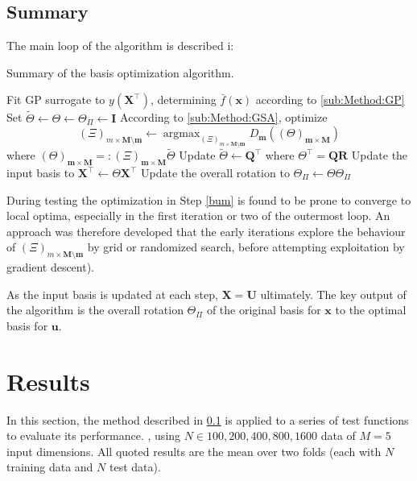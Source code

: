 \documentclass[preprint,12pt]{elsarticle}
\newcommand*{\M}[1]{\ensuremath{#1}\xspace}
\newcommand*{\vr}[1]{\M{\mathbf{#1}}}
\newcommand*{\deqr}{\M{=\mathrel{\mathop:}}}
\DeclareMathOperator*{\argmax}{argmax}
\begin{document}
        \subsection{Summary} \label{sub:Method:Summary}
            The main loop of the algorithm is described i:
            
            \begin{algorithm}
            \caption{Summary of the basis optimization algorithm.}
                \begin{algorithmic}[1]
                    \REPEAT
                        \STATE Fit GP surrogate to $y(\vr{X}^{\intercal})$, determining $\bar{f}(\vr{x})$ according to \cref{sub:Method:GP}
                        \STATE Set $\tilde{\Theta} \leftarrow \Theta \leftarrow \Theta_{\Pi} \leftarrow \vr{I}$
                            \STATE According to \cref{sub:Method:GSA}, optimize \label{bum}
                            $$(\Xi)_{m\times\vr{M}\setminus\vr{m}} \leftarrow \argmax_{(\Xi)_{m\times\vr{M}\setminus\vr{m}}} D_{\vr{m}}((\Theta)_{\vr{m}\times\vr{M}})$$
                            where $(\Theta)_{\vr{m}\times\vr{M}} \deqr (\Xi)_{\vr{m}\times\vr{M}} \tilde{\Theta}$
                            \STATE  Update $\tilde{\Theta} \leftarrow \vr{Q}^{\intercal}$ where $\Theta^{\intercal} = \vr{Q}\vr{R}$
                        \ENDFOR
                        \STATE Update the input basis to $\vr{X}^{\intercal} \leftarrow \Theta \vr{X}^{\intercal}$
                        \STATE Update the overall rotation to $\Theta_{\Pi} \leftarrow \Theta \Theta_{\Pi}$
                    \UNTIL{$\Theta \approx \vr{I}$}
                \end{algorithmic}
            \end{algorithm}

            During testing the optimization in Step \ref{bum} is found to be prone to converge to local optima, especially in the first iteration or two of the outermost loop. An approach was therefore developed that the early iterations explore the behaviour of \M{(\Xi)_{m\times\vr{M}\setminus\vr{m}}} by grid or randomized search, before attempting exploitation by gradient descent).

            As the input basis is updated at each step, \M{\vr{X} = \vr{U}} ultimately. 
            The key output of the algorithm is the overall rotation \M{\Theta_{\Pi}} of the original basis for \vr{x} to the optimal basis for \vr{u}.
            
    \section{Results} \label{sec:Results}
        In this section, the method described in \cref{sub:Method:Summary} is applied to a series of test functions to evaluate its performance. , using $N \in {100, 200, 400, 800, 1600}$ data of $M=5$ input dimensions. All quoted results are the mean over two folds (each with $N$ training data and $N$ test data).
        
\end{document}
